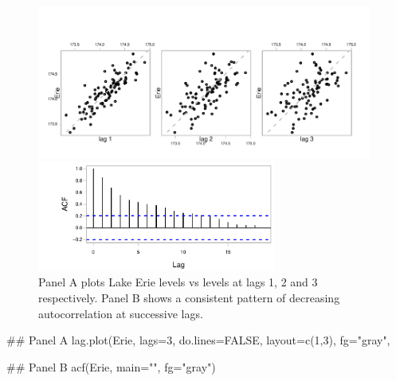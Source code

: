\documentclass{tufte-book}\usepackage[]{graphicx}\usepackage[]{color}
\begin{document}
\begin{figure}
\begin{Schunk}


\centerline{\includegraphics[width=0.98\textwidth]{figs/9-lagErie-1} }

\end{Schunk}
\vspace*{-3pt}

\begin{Schunk}


\centerline{\includegraphics[width=0.7\textwidth]{figs/9-acfErie-1} }

\end{Schunk}
\caption{Panel A plots Lake Erie levels vs levels at lags 1, 2 and 3
  respectively. Panel B shows a consistent pattern of decreasing
  autocorrelation at successive lags.
}\label{erie-lagplot}
\vspace*{-6pt}
\end{figure}

\begin{marginfigure}[-10cm]
\begin{Schunk}
\begin{Sinput}
## Panel A
lag.plot(Erie, lags=3,
         do.lines=FALSE,
         layout=c(1,3), fg="gray",
\end{Sinput}
\end{Schunk}
\begin{Schunk}
\begin{Sinput}
## Panel B
acf(Erie, main="", fg="gray")
\end{Sinput}
\end{Schunk}
\end{marginfigure}
\end{document}
